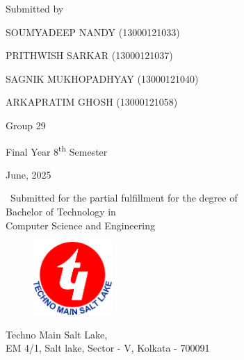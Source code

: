 \thispagestyle{empty}
\begin{center}
    { \Large {\bfseries {\mytitle}} \par}
\vspace{2\baselineskip}
    {
    \large{Submitted by} 
    
    \vspace{2\baselineskip}

\vspace{\baselineskip}

    {SOUMYADEEP NANDY (13000121033)}
    
    \vspace{\baselineskip}

   {PRITHWISH SARKAR (13000121037)}
  \vspace{\baselineskip}

     {SAGNIK MUKHOPADHYAY (13000121040)}
    \vspace{\baselineskip}

    {ARKAPRATIM GHOSH (13000121058)}

\vspace{1\baselineskip}
\vspace{1\baselineskip}
    \large{Group 29}}
    
 \vspace{1\baselineskip}   
    \large{Final Year 8\textsuperscript{th} Semester \par}   
\vspace{\baselineskip}
    \large{June, 2025}
    
\vspace{\baselineskip}
    {\ {Submitted for the partial fulfillment for the degree of \\Bachelor of Technology in \\Computer Science and Engineering }\par}
\vspace{1\baselineskip}
    {\begin{figure}[!h] 
	\centering
	\includegraphics[width=30mm]{./Images/tmsl.png} 
     \end{figure}
    }
\vspace{1.5\baselineskip}

    { {Techno Main Salt Lake,\\
                    EM 4/1, Salt lake, Sector - V, Kolkata - 700091} \par}
 \end{center}